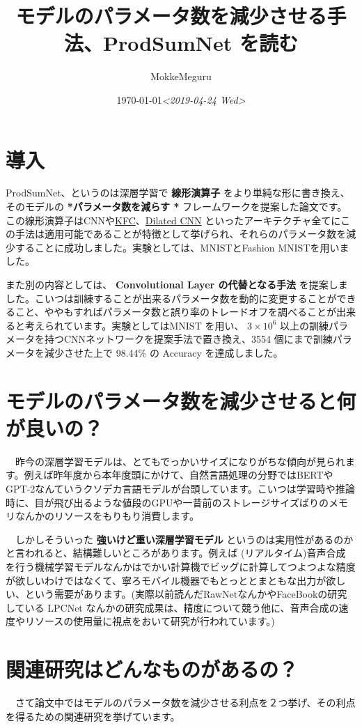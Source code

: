 \documentclass{article}
\author{MokkeMeguru}
\date{\today \textit{<2019-04-24 Wed>}}
\title{モデルのパラメータ数を減少させる手法、ProdSumNet を読む}
\begin{document}
\maketitle
\tableofcontents

\section{導入}
\label{sec:org6440672}
ProdSumNet、というのは深層学習で \textbf{線形演算子} をより単純な形に書き換え、そのモデルの \textbf{*パラメータ数を減らす *} フレームワークを提案した論文です。この線形演算子はCNNや\href{https://arxiv.org/abs/1602.01407}{KFC}、\href{https://towardsdatascience.com/understanding-2d-dilated-convolution-operation-with-examples-in-numpy-and-tensorflow-with-d376b3972b25}{Dilated CNN} といったアーキテクチャ全てにこの手法は適用可能であることが特徴として挙げられ、それらのパラメータ数を減少することに成功しました。実験としては、MNISTとFashion MNISTを用いました。

また別の内容としては、 \textbf{Convolutional Layer の代替となる手法} を提案しました。こいつは訓練することが出来るパラメータ数を動的に変更することができること、ややもすればパラメータ数と誤り率のトレードオフを調べることが出来ると考えられています。実験としてはMNIST を用い、 \(3 \times 10^6\) 以上の訓練パラメータを持つCNNネットワークを提案手法で置き換え、3554 個にまで訓練パラメータを減少させた上で 98.44\% の Accuracy を達成しました。
\section{モデルのパラメータ数を減少させると何が良いの？}
\label{sec:org5e5e61c}
　昨今の深層学習モデルは、とてもでっかいサイズになりがちな傾向が見られます。例えば昨年度から本年度頭にかけて、自然言語処理の分野ではBERTやGPT-2なんていうクソデカ言語モデルが台頭しています。こいつは学習時や推論時に、目が飛び出るような値段のGPUや一昔前のストレージサイズばりのメモリなんかのリソースをもりもり消費します。

　しかしそういった \textbf{強いけど重い深層学習モデル} というのは実用性があるのかと言われると、結構難しいところがあります。例えば (リアルタイム)音声合成 を行う機械学習モデルなんかはでかい計算機でビッグに計算してつよつよな精度が欲しいわけではなくて、寧ろモバイル機器でもとっととまともな出力が欲しい、という需要があります。(実際以前読んだRawNetなんかやFaceBookの研究している LPCNet なんかの研究成果は、精度について競う他に、音声合成の速度やリソースの使用量に視点をおいて研究が行われています。)

\section{関連研究はどんなものがあるの？}
\label{sec:org5db22c1}
　さて論文中ではモデルのパラメータ数を減少させる利点を２つ挙げ、その利点を得るための関連研究を挙げています。
\end{document}
